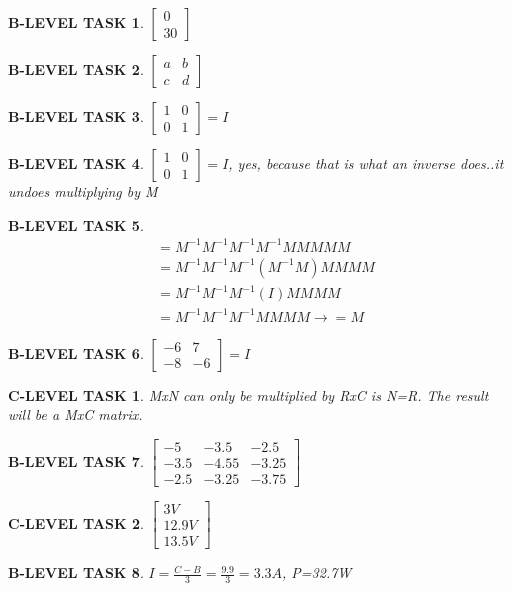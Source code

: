 \documentclass{book}
\numberwithin{equation}{section}
\newtheorem{blevel}{B-LEVEL TASK}
\newtheorem{clevel}{C-LEVEL TASK}
\theoremstyle{definition}
\begin{document}
\begin{blevel} $\left[ \begin{matrix}0\\30 \end{matrix}\right]$ \end{blevel}
\begin{blevel} $\left[ \begin{matrix}a&b\\c&d \end{matrix}\right]$ \end{blevel}
\begin{blevel} $\left[ \begin{matrix}1&0\\0&1 \end{matrix}\right]=I$ \end{blevel}
\begin{blevel} $\left[ \begin{matrix}1&0\\0&1 \end{matrix}\right]=I$, yes, because that is what an inverse does..it undoes multiplying by M \end{blevel}
\begin{blevel} \begin{align*}
&=M^{-1}M^{-1}M^{-1}M^{-1}MMMMM\\
&=M^{-1}M^{-1}M^{-1}(M^{-1}M)MMMM\\
&=M^{-1}M^{-1}M^{-1}(I)MMMM\\
&=M^{-1}M^{-1}M^{-1}MMMM \rightarrow = M
\end{align*}
\end{blevel}
\begin{blevel} $\left[ \begin{matrix}-6&7\\-8&-6 \end{matrix}\right]=I$ \end{blevel}
\begin{clevel}MxN can only be multiplied by RxC is N=R. The result will be a MxC matrix.\end{clevel}
\begin{blevel} $\left[ \begin{matrix}-5&-3.5&-2.5\\-3.5&-4.55&-3.25\\-2.5&-3.25&-3.75 \end{matrix}\right]$ \end{blevel}
\begin{clevel} $\left[ \begin{matrix}3V\\12.9V\\13.5V \end{matrix}\right]$ 
\end{clevel}
\begin{blevel} $I=\frac{C-B}{3}=\frac{9.9}{3}=3.3A$, P=32.7W \end{blevel}
\end{document}
